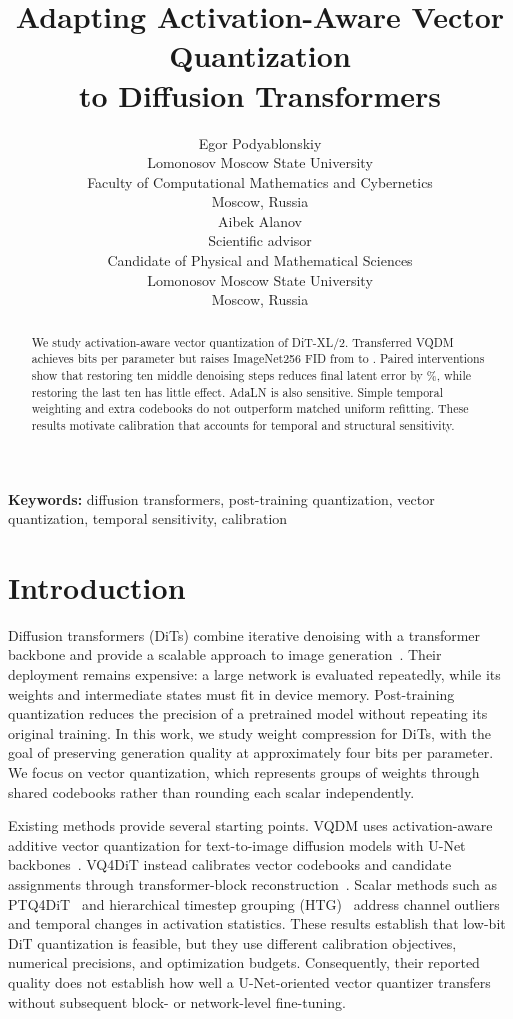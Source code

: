 \documentclass{article}
\title{Adapting Activation-Aware Vector Quantization\\
to Diffusion Transformers}
\author{
  Egor Podyablonskiy\\
  Lomonosov Moscow State University\\
  Faculty of Computational Mathematics and Cybernetics\\
  Moscow, Russia\\
  \And
  Aibek Alanov\\
  Scientific advisor\\
  Candidate of Physical and Mathematical Sciences\\
  Lomonosov Moscow State University\\
  Moscow, Russia\\
}
\begin{document}
\raggedbottom



\maketitle

\begin{abstract}
We study activation-aware vector quantization of DiT-XL/2. Transferred VQDM achieves \VQBits{} bits per parameter but raises ImageNet256 FID from \OriginalFID{} to \VQFID{}. Paired interventions show that restoring ten middle denoising steps reduces final latent error by \MiddleGainThousand\%, while restoring the last ten has little effect. AdaLN is also sensitive. Simple temporal weighting and extra codebooks do not outperform matched uniform refitting. These results motivate calibration that accounts for temporal and structural sensitivity.
\end{abstract}

\textbf{Keywords:} diffusion transformers, post-training quantization, vector quantization, temporal sensitivity, calibration

\section{Introduction}\label{sec:intro}

Diffusion transformers (DiTs) combine iterative denoising with a transformer backbone and provide a scalable approach to image generation~\citep{peebles2023dit}. Their deployment remains expensive: a large network is evaluated repeatedly, while its weights and intermediate states must fit in device memory. Post-training quantization reduces the precision of a pretrained model without repeating its original training. In this work, we study weight compression for DiTs, with the goal of preserving generation quality at approximately four bits per parameter. We focus on vector quantization, which represents groups of weights through shared codebooks rather than rounding each scalar independently.

Existing methods provide several starting points. VQDM uses activation-aware additive vector quantization for text-to-image diffusion models with U-Net backbones~\citep{egiazarian2024vqdm}. VQ4DiT instead calibrates vector codebooks and candidate assignments through transformer-block reconstruction~\citep{deng2024vq4dit}. Scalar methods such as PTQ4DiT~\citep{wu2024ptq4dit} and hierarchical timestep grouping (HTG)~\citep{ding2025htg} address channel outliers and temporal changes in activation statistics. These results establish that low-bit DiT quantization is feasible, but they use different calibration objectives, numerical precisions, and optimization budgets. Consequently, their reported quality does not establish how well a U-Net-oriented vector quantizer transfers without subsequent block- or network-level fine-tuning.
\end{document}
